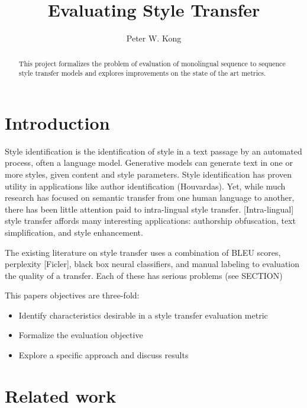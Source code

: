 \documentclass[letterpaper, 10 pt, conference]{ieeeconf}  %
\title{\LARGE \bf
Evaluating Style Transfer
}
\author{Peter W. Kong}
\begin{document}
\maketitle
\thispagestyle{empty}
\pagestyle{empty}


\begin{abstract}

This project formalizes the problem of evaluation of monolingual sequence to sequence style transfer models and explores improvements on the state of the art metrics.

\end{abstract}




\section{Introduction}
                
        
Style identification is the identification of style in a text passage by an automated process, often a language model. Generative models can generate text in one or more styles, given content and style parameters. Style identification has proven utility in applications like author identification (Houvardas). Yet, while much research has focused on semantic transfer from one human language to another, there has been little attention paid to intra-lingual style transfer. [Intra-lingual] style transfer affords many interesting applications: authorship obfuscation, text simplification, and style enhancement.

The existing literature on style transfer uses a combination of BLEU scores, perplexity [Ficler], black box neural classifiers, and manual labeling to evaluation the quality of a transfer. Each of these has serious problems (see SECTION)


This paper\textquotesingle s objectives are three-fold:
\begin{itemize}
    \item Identify characteristics desirable in a style transfer evaluation metric
    \item Formalize the evaluation objective
    \item Explore a specific approach and discuss results
\end{itemize}
          

\section{Related work}
\end{document}
